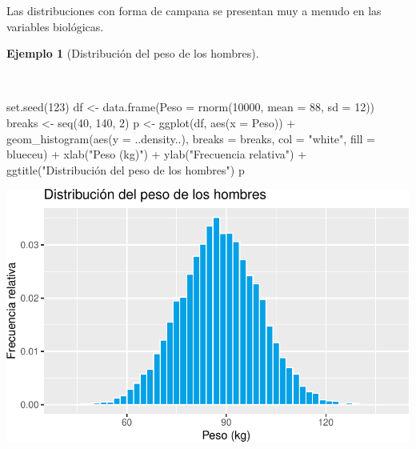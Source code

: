 \documentclass[
  a4paper,
]{scrreport}
\newenvironment{Shaded}{\begin{snugshade}}{\end{snugshade}}
\newcommand{\AttributeTok}[1]{\textcolor[rgb]{0.40,0.45,0.13}{#1}}
\newcommand{\DecValTok}[1]{\textcolor[rgb]{0.68,0.00,0.00}{#1}}
\newcommand{\FunctionTok}[1]{\textcolor[rgb]{0.28,0.35,0.67}{#1}}
\newcommand{\NormalTok}[1]{\textcolor[rgb]{0.00,0.23,0.31}{#1}}
\newcommand{\OtherTok}[1]{\textcolor[rgb]{0.00,0.23,0.31}{#1}}
\newcommand{\SpecialCharTok}[1]{\textcolor[rgb]{0.37,0.37,0.37}{#1}}
\newcommand{\StringTok}[1]{\textcolor[rgb]{0.13,0.47,0.30}{#1}}
\theoremstyle{plain}
\theoremstyle{definition}
\theoremstyle{definition}
\newtheorem{example}{Ejemplo}[chapter]
\theoremstyle{remark}
\begin{document}
Las distribuciones con forma de campana se presentan muy a menudo en las
variables biológicas.

\begin{example}[Distribución del peso de los
hombres]\protect\hypertarget{exm-distribucion-peso-hombres}{}\label{exm-distribucion-peso-hombres}

~

\begin{Shaded}
\begin{Highlighting}[]
\FunctionTok{set.seed}\NormalTok{(}\DecValTok{123}\NormalTok{)}
\NormalTok{df }\OtherTok{\textless{}{-}} \FunctionTok{data.frame}\NormalTok{(}\AttributeTok{Peso =} \FunctionTok{rnorm}\NormalTok{(}\DecValTok{10000}\NormalTok{, }\AttributeTok{mean =} \DecValTok{88}\NormalTok{, }\AttributeTok{sd =} \DecValTok{12}\NormalTok{))}
\NormalTok{breaks }\OtherTok{\textless{}{-}} \FunctionTok{seq}\NormalTok{(}\DecValTok{40}\NormalTok{, }\DecValTok{140}\NormalTok{, }\DecValTok{2}\NormalTok{)}
\NormalTok{p }\OtherTok{\textless{}{-}} \FunctionTok{ggplot}\NormalTok{(df, }\FunctionTok{aes}\NormalTok{(}\AttributeTok{x =}\NormalTok{ Peso)) }\SpecialCharTok{+}
    \FunctionTok{geom\_histogram}\NormalTok{(}\FunctionTok{aes}\NormalTok{(}\AttributeTok{y =}\NormalTok{ ..density..), }\AttributeTok{breaks =}\NormalTok{ breaks, }\AttributeTok{col =} \StringTok{"white"}\NormalTok{, }\AttributeTok{fill =}\NormalTok{ blueceu) }\SpecialCharTok{+}
    \FunctionTok{xlab}\NormalTok{(}\StringTok{"Peso (kg)"}\NormalTok{) }\SpecialCharTok{+}
    \FunctionTok{ylab}\NormalTok{(}\StringTok{"Frecuencia relativa"}\NormalTok{) }\SpecialCharTok{+}
    \FunctionTok{ggtitle}\NormalTok{(}\StringTok{"Distribución del peso de los hombres"}\NormalTok{)}
\NormalTok{p}
\end{Highlighting}
\end{Shaded}

\includegraphics{02-estadistica-descriptiva_files/figure-pdf/histograma-peso-hombres-1.pdf}

\end{example}
\end{document}
